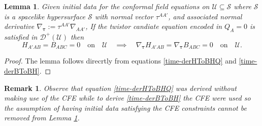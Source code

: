 \documentclass[10pt,a4paper]{article}
\theoremstyle{plain}
\newtheorem{lemma}{Lemma}
\newtheorem{remark}{Remark}
\begin{document}
\begin{lemma}\label{lemma:twistor_removing_redundancy}
  Given initial data for the conformal field equations on $\mathcal{U}\subseteq\mathcal{S}$
  where $\mathcal{S}$ is a spacelike
hypersurface $\mathcal{S}$ with normal vector $\tau^{AA'}$, and
associated normal derivative $\nabla_{\bm\tau} :=
\tau^{AA'}\nabla_{AA'}$,
If the twistor candiate equation encoded in
$Q_A=0$ is satisfied in $\mathcal{D}^{+}(\mathcal{U})$ then
\begin{equation}
H_{A'AB}=B_{ABC}=0   \quad \text{on} \quad \mathcal{U} \quad \implies \quad
\nabla_{\bm\tau}H_{A'AB}=\nabla_{\bm\tau} B_{ABC}=0  \quad \text{on} \quad \mathcal{U}.
\end{equation} 
\end{lemma}

\begin{proof}
  The lemma follows direcrtly from equations \eqref{time-derHToBHQ} and \eqref{time-derBToBH}.
\end{proof}

\begin{remark}\emph{
Observe that equation \eqref{time-derHToBHQ} was derived without making use of
the CFE while to derive \eqref{time-derBToBH} the CFE were used so the
assumption of having initial data satisfying the CFE constraints cannot be removed from
Lemma \ref{lemma:twistor_removing_redundancy}.
}
\end{remark}

\end{document}
